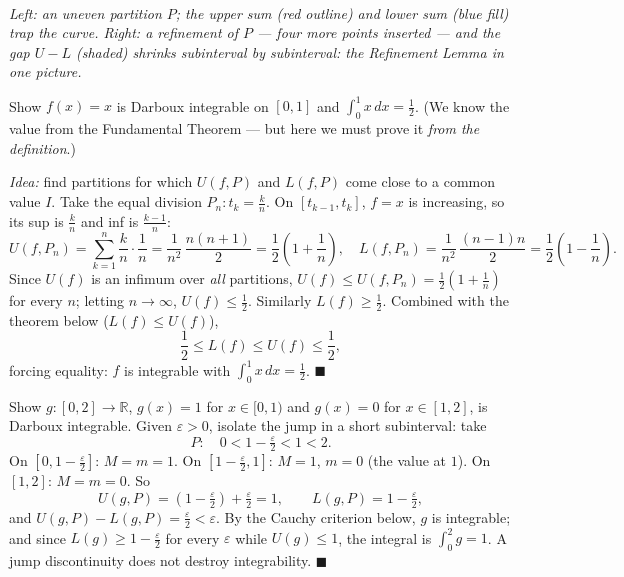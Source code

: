\documentclass[11pt]{report}
\newcommand{\figcap}[1]{\\[1.5mm]\parbox{0.92\textwidth}{\small\itshape #1}}
\begin{document}
\begin{center}
\figcap{Left: an uneven partition $P$; the upper sum (red outline) and lower sum (blue fill) trap the curve. Right: a refinement of $P$ --- four more points inserted --- and the gap $U - L$ (shaded) shrinks subinterval by subinterval: the Refinement Lemma in one picture.}
\end{center}


\begin{exbox}
Show $f(x) = x$ is Darboux integrable on $[0,1]$ and $\int_0^1 x\,dx = \tfrac12$. (We know the value from the Fundamental Theorem --- but here we must prove it \emph{from the definition}.)

\emph{Idea:} find partitions for which $U(f,P)$ and $L(f,P)$ come close to a common value $I$. Take the equal division $P_n: t_k = \tfrac kn$. On $[t_{k-1}, t_k]$, $f = x$ is increasing, so its sup is $\tfrac kn$ and inf is $\tfrac{k-1}{n}$:
\[
U(f, P_n) = \sum_{k=1}^n \frac kn \cdot \frac1n = \frac{1}{n^2}\, \frac{n(n+1)}{2} = \frac12\left(1 + \frac1n\right),
\quad
L(f, P_n) = \frac{1}{n^2}\, \frac{(n-1)n}{2} = \frac12\left(1 - \frac1n\right).
\]
Since $U(f)$ is an infimum over \emph{all} partitions, $U(f) \leq U(f, P_n) = \tfrac12(1 + \tfrac1n)$ for every $n$; letting $n \to \infty$, $U(f) \leq \tfrac12$. Similarly $L(f) \geq \tfrac12$. Combined with the theorem below ($L(f) \leq U(f)$),
\[
\frac12 \leq L(f) \leq U(f) \leq \frac12,
\]
forcing equality: $f$ is integrable with $\int_0^1 x\,dx = \tfrac12$. \hfill $\blacksquare$
\end{exbox}

\begin{exbox}
Show $g: [0,2] \to \mathbb{R}$, $g(x) = 1$ for $x \in [0,1)$ and $g(x) = 0$ for $x \in [1,2]$, is Darboux integrable. Given $\varepsilon > 0$, isolate the jump in a short subinterval: take
\[
P: \quad 0 < 1 - \tfrac\varepsilon2 < 1 < 2.
\]
On $[0, 1-\tfrac\varepsilon2]$: $M = m = 1$. On $[1-\tfrac\varepsilon2, 1]$: $M = 1$, $m = 0$ (the value at $1$). On $[1,2]$: $M = m = 0$. So
\[
U(g,P) = \left(1 - \tfrac\varepsilon2\right) + \tfrac\varepsilon2 = 1, \qquad L(g,P) = 1 - \tfrac\varepsilon2,
\]
and $U(g,P) - L(g,P) = \tfrac\varepsilon2 < \varepsilon$. By the Cauchy criterion below, $g$ is integrable; and since $L(g) \geq 1 - \tfrac\varepsilon2$ for every $\varepsilon$ while $U(g) \leq 1$, the integral is $\int_0^2 g = 1$. A jump discontinuity does not destroy integrability. \hfill $\blacksquare$
\end{exbox}
\end{document}
